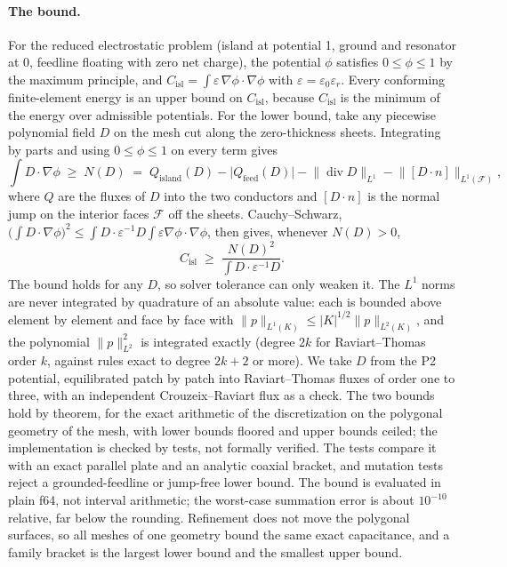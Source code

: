 \documentclass{anvil-paper}
\newcommand{\Cisl}{C_{\mathrm{isl}}}
\begin{document}
\paragraph{The bound.}
For the reduced electrostatic problem (island at potential 1, ground and
resonator at 0, feedline floating with zero net charge), the potential
$\phi$ satisfies $0 \le \phi \le 1$ by the maximum principle, and
$\Cisl = \int \varepsilon\,\nabla\phi\cdot\nabla\phi$ with $\varepsilon
= \varepsilon_0\varepsilon_r$. Every conforming finite-element energy is an
upper bound on $\Cisl$, because $\Cisl$ is the minimum of the energy
over admissible potentials. For the lower bound, take any piecewise
polynomial field $D$ on the mesh cut along the zero-thickness sheets.
Integrating by parts and using $0\le\phi\le1$ on every term gives
\begin{equation}
  \int D\cdot\nabla\phi \;\ge\; N(D) \;=\; Q_{\mathrm{island}}(D)
  - \lvert Q_{\mathrm{feed}}(D)\rvert
  - \lVert \operatorname{div} D\rVert_{L^1}
  - \lVert [D\cdot n]\rVert_{L^1(\mathcal F)},
  \label{eq:cert-n}
\end{equation}
where $Q$ are the fluxes of $D$ into the two conductors and
$[D\cdot n]$ is the normal jump on the interior faces $\mathcal F$ off
the sheets. Cauchy--Schwarz, $\bigl(\int D\cdot\nabla\phi\bigr)^2 \le
\int D\cdot\varepsilon^{-1}D \int\varepsilon\nabla\phi\cdot\nabla\phi$,
then gives, whenever $N(D) > 0$,
\begin{equation}
  \Cisl \;\ge\; \frac{N(D)^2}{\int D\cdot\varepsilon^{-1}D}.
  \label{eq:cert}
\end{equation}
The bound holds for any $D$, so solver tolerance can only weaken it. The
$L^1$ norms are never integrated by quadrature of an absolute value: each
is bounded above element by element and face by face with
$\lVert p\rVert_{L^1(K)} \le |K|^{1/2}\lVert p\rVert_{L^2(K)}$, and the
polynomial $\lVert p\rVert_{L^2}^2$ is integrated exactly (degree $2k$ for
Raviart--Thomas order $k$, against rules exact to degree $2k+2$ or more). We
take $D$ from the P2 potential, equilibrated patch by patch into
Raviart--Thomas fluxes of order one to three, with an independent
Crouzeix--Raviart flux as a check. The two bounds hold by theorem, for the
exact arithmetic of the discretization on the polygonal geometry of the
mesh, with lower bounds floored and upper bounds ceiled; the implementation
is checked by tests, not formally verified. The tests compare it with an
exact parallel plate and an analytic coaxial bracket, and mutation tests
reject a grounded-feedline or jump-free lower bound. The bound is evaluated
in plain f64, not interval arithmetic; the worst-case summation error is about
$10^{-10}$ relative, far below the rounding. Refinement does not move the
polygonal surfaces, so all meshes of one geometry bound the same exact
capacitance, and a family bracket is the largest lower bound and the
smallest upper bound.
\end{document}
